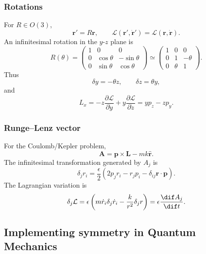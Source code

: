 \subsubsection{Rotations}
For $R\in O(3)$,
\begin{equation}
 \bm r'=R\bm r,
 \qquad
 \mathcal L(\bm r',\dot{\bm r}')
 =\mathcal L(\bm r,\dot{\bm r}).
\end{equation}
An infinitesimal rotation in the $y$-$z$ plane is
\begin{equation}
 R(\theta)=
 \begin{pmatrix}
 1&0&0\\
 0&\cos\theta&-\sin\theta\\
 0&\sin\theta&\cos\theta
 \end{pmatrix}
 \simeq
 \begin{pmatrix}
 1&0&0\\
 0&1&-\theta\\
 0&\theta&1
 \end{pmatrix}.
\end{equation}
Thus
\begin{equation}
 \delta y=-\theta z,
 \qquad
 \delta z=\theta y,
\end{equation}
and
\begin{equation}
 \boxed{L_x=-z\frac{\partial\mathcal L}{\partial\dot y}
 +y\frac{\partial\mathcal L}{\partial\dot z}
 =yp_z-zp_y.}
\end{equation}

\subsubsection{Runge--Lenz vector}
For the Coulomb/Kepler problem,
\begin{equation}
 \boxed{\bm A=\bm p\times\bm L-mk\hat{\bm r}.}
\end{equation}
The infinitesimal transformation generated by $A_j$ is
\begin{equation}
 \delta_j r_i
 =\frac{\epsilon}{2}
 \left(2p_jr_i-r_jp_i-\delta_{ij}\bm r\cdot\bm p\right).
\end{equation}
The Lagrangian variation is
\begin{equation}
 \delta_j\mathcal L
 =\epsilon\left(
 m\dot r_i\delta_j\dot r_i-\frac{k}{r^2}\delta_jr
 \right)
 =\epsilon\frac{\dif A_j}{\dif t}.
\end{equation}

\subsection{Implementing symmetry in Quantum Mechanics}

